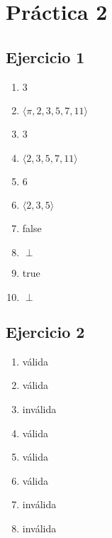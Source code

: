 
\usepackage{caratula}
\usepackage{enumerate}
\usepackage{hyperref}
\usepackage{graphicx}
\usepackage{amsfonts}
\usepackage{enumitem}

\decimalpoint
\hypersetup{colorlinks=true, linkcolor=black, urlcolor=blue}
\setlength{\parindent}{0em}
\setlength{\parskip}{0.5em}
\setcounter{tocdepth}{2} %
\setcounter{section}{1} %
\renewcommand{\thesubsubsection}{\thesubsection.\Alph{subsubsection}}
\graphicspath{ {images/} }





\maketitle
\newpage

\tableofcontents
\newpage


\section{Práctica 2}

\subsection{Ejercicio 1}

\begin{enumerate}[label=(\alph*)]
    \item 3
    \item $\langle \pi, 2, 3,5,7,11 \rangle$
    \item 3
    \item $\langle 2,3,5,7,11 \rangle$
    \item 6
    \item $\langle 2,3,5 \rangle$
    \item false
    \item $\perp$
    \item true
    \item $\perp$
\end{enumerate}

\subsection{Ejercicio 2}
\begin{enumerate}[label=(\alph*)]
    \item válida
    \item válida
    \item inválida
    \item válida
    \item válida
    \item válida
    \item inválida
    \item inválida
\end{enumerate}


